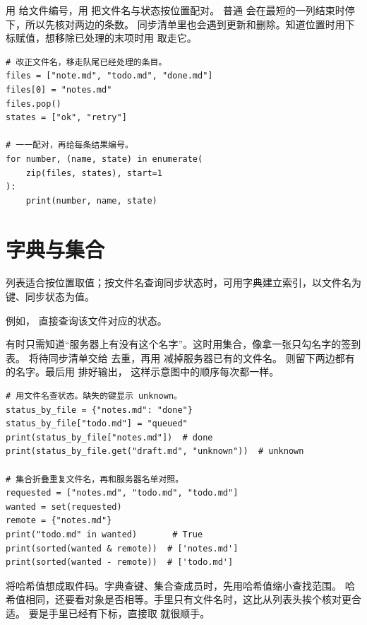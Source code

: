 用  给文件编号，用  把文件名与状态按位置配对。
普通  会在最短的一列结束时停下，所以先核对两边的条数。
同步清单里也会遇到更新和删除。知道位置时用下标赋值，想移除已处理的末项时用
 取走它。


\begin{lstlisting}[title={\code{number_tasks.py}}]
# 改正文件名，移走队尾已经处理的条目。
files = ["note.md", "todo.md", "done.md"]
files[0] = "notes.md"
files.pop()
states = ["ok", "retry"]

# 一一配对，再给每条结果编号。
for number, (name, state) in enumerate(
    zip(files, states), start=1
):
    print(number, name, state)
\end{lstlisting}


\section{字典与集合}
\label{sec:dicts-and-sets}

列表适合按位置取值；按文件名查询同步状态时，可用字典建立索引，以文件名为键、同步状态为值。

例如， 直接查询该文件对应的状态。

有时只需知道“服务器上有没有这个名字”。这时用集合，像拿一张只勾名字的签到表。
将待同步清单交给  去重，再用 \code{-} 减掉服务器已有的文件名。
\code{&} 则留下两边都有的名字。最后用  排好输出，
这样示意图中的顺序每次都一样。


\begin{lstlisting}[title={\code{sync_index.py}}]
# 用文件名查状态。缺失的键显示 unknown。
status_by_file = {"notes.md": "done"}
status_by_file["todo.md"] = "queued"
print(status_by_file["notes.md"])  # done
print(status_by_file.get("draft.md", "unknown"))  # unknown

# 集合折叠重复文件名，再和服务器名单对照。
requested = ["notes.md", "todo.md", "todo.md"]
wanted = set(requested)
remote = {"notes.md"}
print("todo.md" in wanted)       # True
print(sorted(wanted & remote))  # ['notes.md']
print(sorted(wanted - remote))  # ['todo.md']
\end{lstlisting}


\begin{myunderstanding}
将哈希值想成取件码。字典查键、集合查成员时，先用哈希值缩小查找范围。
哈希值相同，还要看对象是否相等。手里只有文件名时，这比从列表头挨个核对更合适。
要是手里已经有下标，直接取  就很顺手。
\end{myunderstanding}

